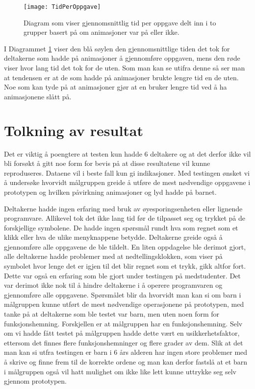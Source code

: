  
\begin{figure}[ht!] 
\centering 
\texttt{[image: TidPerOppgave]} 
\caption{Diagram som viser gjennomsnittlig tid per oppgave delt inn i to grupper basert på om animasjoner var på eller ikke.} 
\label{fig:DiagramTidPerOppgave} 
\end{figure} 
 
 
I Diagrammet \ref{fig:DiagramTidPerOppgave} viser den blå søylen den gjennomsnittlige tiden det tok for deltakerne som hadde på animasjoner å gjennomføre oppgaven, mens den røde viser hvor lang tid det tok for de uten. Som man kan se utifra denne så ser man at tendensen er at de som hadde på animasjoner brukte lengre tid en de uten. Noe som kan tyde på at animasjoner gjør at en bruker lengre tid ved å ha animasjonene slått på.  
 
 
 
 
 
 
 
 
 
 
 
 
 
 
 
 
 
 
\section{Tolkning av resultat} 
 
 
Det er viktig å poengtere at testen kun hadde 6 deltakere og at det derfor ikke vil bli forsøkt å gitt noe form for bevis på at disse resultatene vil kunne reproduseres. Dataene vil i beste fall kun gi indikasjoner.  Med testingen ønsket vi å undersøke hvorvidt målgruppen greide å utføre de mest nødvendige oppgavene i prototypen og hvilken påvirkning animasjoner og lyd hadde på barnet.  
 
Deltakerne hadde ingen erfaring med bruk av øyesporingsenheten eller lignende programvare. Allikevel tok det ikke lang tid før de tilpasset seg og trykket på de forskjellige symbolene. De hadde ingen spørsmål rundt hva som regnet som et klikk eller hva de ulike menyknappene betydde. Deltakerne greide også å gjennomføre alle oppgavene de ble tildelt. En liten oppdagelse ble derimot gjort, alle deltakerne hadde problemer med at nedtellingsklokken, som viser på symbolet hvor lenge det er igjen til det blir regnet som et trykk, gikk altfor fort. Dette var også en erfaring som ble gjort under testingen på medstudenter.  Det var derimot ikke nok til å hindre deltakerne i å operere programvaren og gjennomføre alle oppgavene. Spørsmålet blir da hvorvidt man kan si om barn i målgruppen kunne utført de mest nødvendige operasjonene på prototypen, med tanke på at deltakerne som ble testet var barn, men uten noen form for funksjonshemning. Forskjellen er at målgruppen har en funksjonshemning. Selv om vi hadde fått testet på målgruppen hadde dette vært en usikkerhetsfaktor, ettersom det finnes flere funksjonshemninger og flere grader av dem. Slik at det man kan si utfra testingen er barn i 6 års alderen har ingen store problemer med å skrive og finne frem til de korrekte ordene og man kan derfor fastslå at et barn i målgruppen også vil hatt mulighet om ikke like lett kunne uttrykke seg selv gjennom prototypen. 
 
